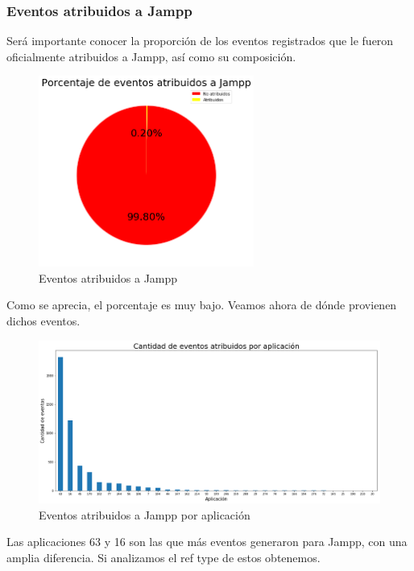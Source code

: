 \documentclass[a4paper, 12pt]{article}
\begin{document}
	\subsubsection{Eventos atribuidos a Jampp}
		Será importante conocer la proporción de los eventos registrados que le fueron oficialmente atribuidos a Jampp, así como su composición.
		
		\FloatBarrier
		\begin{figure}[h]
			\centering
			\includegraphics[width=200pt]{images/events/atribuidos.png}
			\caption{Eventos atribuidos a Jampp}
		\end{figure}
		\FloatBarrier
		
		Como se aprecia, el porcentaje es muy bajo. Veamos ahora de dónde provienen dichos eventos.
		
		\FloatBarrier
		\begin{figure}[h]
			\centering
			\includegraphics[width=\textwidth]{images/events/eventsattributed.png}
			\caption{Eventos atribuidos a Jampp por aplicación}
		\end{figure}
		\FloatBarrier
		
		Las aplicaciones 63 y 16 son las que más eventos generaron para Jampp, con una amplia diferencia.
		Si analizamos el ref type de estos obtenemos.
		
\end{document}
